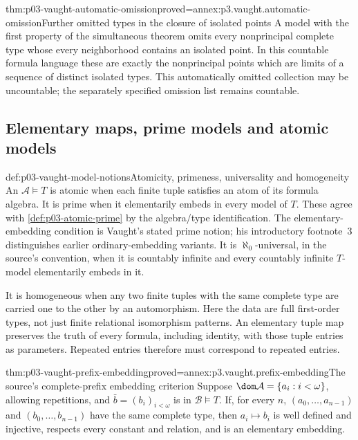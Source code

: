 \begin{hbcorollary}{thm:p03-vaught-automatic-omission}{proved=annex:p3.vaught.automatic-omission}{Further omitted types in the closure of isolated points}
A model with the first property of the simultaneous theorem omits
every nonprincipal complete type whose every neighborhood contains
an isolated point. In this countable formula language these are exactly
the nonprincipal points which are limits of a sequence of distinct
isolated types. This automatically omitted collection may be uncountable;
the separately specified omission list remains countable.
\end{hbcorollary}

\subsection{Elementary maps, prime models and atomic models}
\label{sec:p03-vaught-prime-atomic}

\begin{hbdefinition}{def:p03-vaught-model-notions}{Atomicity, primeness, universality and homogeneity}
An \(\mathcal A\models T\) is atomic when each finite tuple satisfies
an atom of its formula algebra. It is prime when it elementarily embeds
in every model of \(T\). These agree with
\cref{def:p03-atomic-prime} by the algebra/type identification.
The elementary-embedding condition is Vaught's stated prime notion;
his introductory footnote~3 distinguishes earlier ordinary-embedding
variants.
It is \(\aleph_0\)-universal, in the source's convention, when it is
countably infinite and every countably infinite \(T\)-model
elementarily embeds in it.

It is homogeneous when any two finite tuples with the same complete
type are carried one to the other by an automorphism.
Here the data are full first-order types, not just finite relational
isomorphism patterns. An elementary tuple map preserves the truth of
every formula, including identity, with those tuple entries as parameters.
Repeated entries therefore must correspond to repeated entries.
\end{hbdefinition}

\begin{hblemma}{thm:p03-vaught-prefix-embedding}{proved=annex:p3.vaught.prefix-embedding}{The source's complete-prefix embedding criterion}
Suppose \(\dom\mathcal A=\{a_i:i<\omega\}\), allowing repetitions,
and \(\bar b=(b_i)_{i<\omega}\) is in \(\mathcal B\models T\).
If, for every \(n\), \((a_0,\ldots,a_{n-1})\) and
\((b_0,\ldots,b_{n-1})\) have the same complete type, then
\(a_i\mapsto b_i\) is well defined and injective, respects every
constant and relation, and is an elementary embedding.
\end{hblemma}

